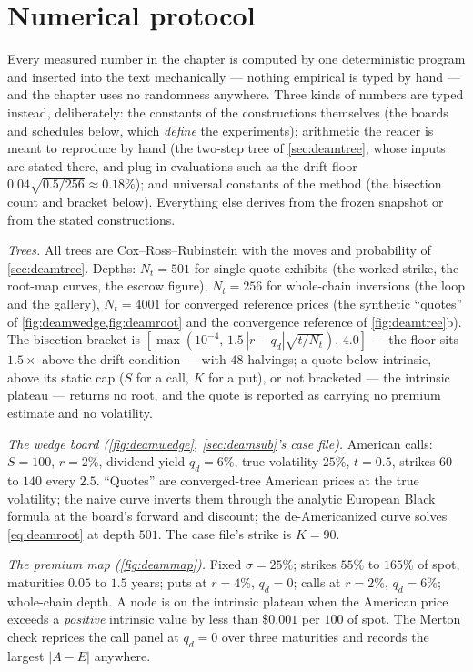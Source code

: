 \section{Numerical protocol}
\label{app:deamprotocol}

Every measured number in the chapter is computed by one deterministic
program and inserted into the text mechanically --- nothing empirical
is typed by hand --- and the chapter uses no randomness anywhere.  Three kinds of numbers are typed instead, deliberately: the
constants of the constructions themselves (the boards and schedules
below, which \emph{define} the experiments); arithmetic the reader is
meant to reproduce by hand (the two-step tree of \cref{sec:deamtree},
whose inputs are stated there, and plug-in evaluations such as the
drift floor $0.04\sqrt{0.5/256}\approx0.18\%$); and universal
constants of the method (the bisection count and bracket below).
Everything else derives from the frozen snapshot or from the stated
constructions.

\emph{Trees.}  All trees are Cox--Ross--Rubinstein with the moves and
probability of \cref{sec:deamtree}.  Depths: $N_t=501$ for
single-quote exhibits (the worked strike, the root-map curves, the
escrow figure), $N_t=256$ for whole-chain inversions (the loop
and the gallery), $N_t=4001$ for converged reference prices (the
synthetic ``quotes'' of \cref{fig:deamwedge,fig:deamroot} and the
convergence reference of \cref{fig:deamtree}b).  The bisection
bracket is $[\max(10^{-4},\,1.5\,|r-q_d|\sqrt{t/N_t}),\,4.0]$ --- the
floor sits $1.5\times$ above the drift condition --- with $48$
halvings; a quote below intrinsic, above its static cap ($S$ for a
call, $K$ for a put), or not bracketed --- the intrinsic plateau ---
returns no root, and the quote is reported as carrying no premium
estimate and no volatility.

\emph{The wedge board (\cref{fig:deamwedge},
\cref{sec:deamsub}'s case file).}  American calls: $S=100$, $r=2\%$,
dividend yield $q_d=6\%$, true volatility $25\%$, $t=0.5$, strikes
$60$ to $140$ every $2.5$.  ``Quotes'' are converged-tree American
prices at the true volatility; the naive curve inverts them through
the analytic European Black formula at the board's forward and
discount; the de-Americanized curve solves \eqref{eq:deamroot} at
depth $501$.  The case file's strike is $K=90$.

\emph{The premium map (\cref{fig:deammap}).}  Fixed $\sigma=25\%$;
strikes $55\%$ to $165\%$ of spot, maturities $0.05$ to $1.5$ years;
puts at $r=4\%$, $q_d=0$; calls at $r=2\%$, $q_d=6\%$; whole-chain
depth.
A node is on the intrinsic plateau when the American price exceeds a
\emph{positive} intrinsic value by less than $\$0.001$ per $100$ of
spot.  The Merton check reprices the call panel at $q_d=0$ over
three maturities and records the largest $|A-E|$ anywhere.

